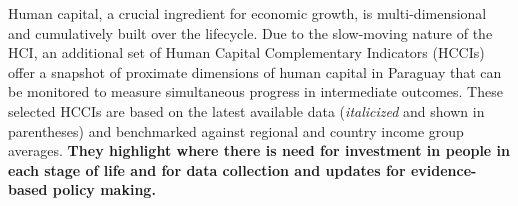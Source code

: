 \documentclass[
  9pt,
]{article}
\begin{document}
\newpage

\vspace{3mm}

Human capital, a crucial ingredient for economic growth, is
multi-dimensional and cumulatively built over the lifecycle. Due to the
slow-moving nature of the HCI, an additional set of Human Capital
Complementary Indicators (HCCIs) offer a snapshot of proximate
dimensions of human capital in Paraguay that can be monitored to measure
simultaneous progress in intermediate outcomes. These selected HCCIs are
based on the latest available data (\emph{italicized} and shown in
parentheses) and benchmarked against regional and country income group
averages. \textbf{They highlight where there is need for investment in
people in each stage of life and for data collection and updates for
evidence-based policy making.}

\vspace{1mm}
\end{document}
